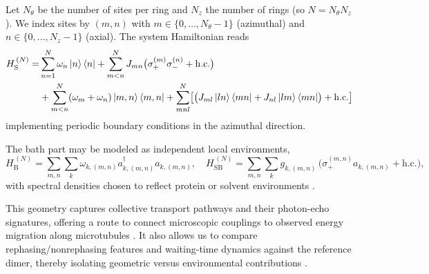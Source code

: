 Let $N_{\theta}$ be the number of sites per ring and $N_{z}$ the number of rings (so $N = N_{\theta} N_{z}$). We index sites by $(m,n)$ with $m\in\{0,\dots,N_{\theta}-1\}$ (azimuthal) and $n\in\{0,\dots,N_{z}-1\}$ (axial). The system Hamiltonian reads
\begin{align}
	H_{\mathrm{S}}^{\,(N)} = & \sum_{n=1}^{N} \omega_{n} \ket{n}\bra{n} + \sum_{m<n}^{N} J_{mn} \bigl( \sigma_{+}^{(m)} \sigma_{-}^{(n)} + \mathrm{h.c.} \bigr) \\
	                         & + \sum_{m<n}^{N} (\omega_{m} + \omega_{n}) \ket{m, n}\bra{m, n}
	+ \sum_{m n l}^{N} \bigl[ \bigl( J_{ml} \ket{ln}\bra{mn}
		+ J_{nl} \ket{lm}\bra{mn} \bigr) + \mathrm{h.c.} \bigr]
	\label{eq:Nqubit_hamiltonian}
\end{align}
implementing periodic boundary conditions in the azimuthal direction.

The bath part may be modeled as independent local environments,
\begin{equation}
	H_{\mathrm{B}}^{\,(N)} = \sum_{m,n} \sum_{k} \omega_{k,(m,n)} a_{k,(m,n)}^{\dagger} a_{k,(m,n)},
	\quad
	H_{\mathrm{SB}}^{\,(N)} = \sum_{m,n} \sum_{k} g_{k,(m,n)}\,\bigl( \sigma_{+}^{(m,n)} a_{k,(m,n)} + \mathrm{h.c.} \bigr),
	\label{eq:Nqubit_bath}
\end{equation}
with spectral densities chosen to reflect protein or solvent environments \cite{rodenetal2012accountingintramolecularvibrational,ritscheleisfeld2014analyticrepresentationsbath}.

This geometry captures collective transport pathways and their photon-echo signatures, offering a route to connect microscopic couplings to observed energy migration along microtubules \cite{kalraetal2023electronicenergymigration}. It also allows us to compare rephasing/nonrephasing features and waiting-time dynamics against the reference dimer, thereby isolating geometric versus environmental contributions \cite{mukamel1995principlesnonlinearoptical,segarra-martietal2018accuratesimulationtwodimensional}.